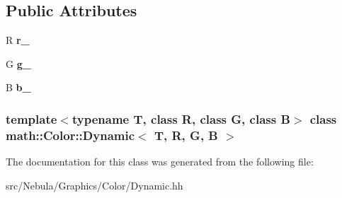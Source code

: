 \subsection*{\-Public \-Attributes}
\begin{DoxyCompactItemize}
\item 
\hypertarget{classmath_1_1Color_1_1Dynamic_acff65527ca36b495e192595d4b497498}{\-R {\bfseries r\-\_\-}}\label{classmath_1_1Color_1_1Dynamic_acff65527ca36b495e192595d4b497498}

\item 
\hypertarget{classmath_1_1Color_1_1Dynamic_a53fcc569fd402f76d834369dc011aaa3}{\-G {\bfseries g\-\_\-}}\label{classmath_1_1Color_1_1Dynamic_a53fcc569fd402f76d834369dc011aaa3}

\item 
\hypertarget{classmath_1_1Color_1_1Dynamic_ad6f2a9af60170e9f690fdb447b377027}{\-B {\bfseries b\-\_\-}}\label{classmath_1_1Color_1_1Dynamic_ad6f2a9af60170e9f690fdb447b377027}

\end{DoxyCompactItemize}
\subsubsection*{template$<$typename T, class R, class G, class B$>$ class math\-::\-Color\-::\-Dynamic$<$ T, R, G, B $>$}



\-The documentation for this class was generated from the following file\-:\begin{DoxyCompactItemize}
\item 
src/\-Nebula/\-Graphics/\-Color/\-Dynamic.\-hh\end{DoxyCompactItemize}
